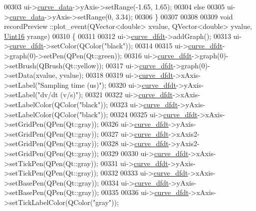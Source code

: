 \begin{DoxyCode}
00303   ui->\hyperlink{a00028_a247d94481323c0bc4f8b6458a8a535dd}{curve\_data}->yAxis->setRange(-1.65, 1.65);
00304   \textcolor{keywordflow}{else}
00305   ui->\hyperlink{a00028_a247d94481323c0bc4f8b6458a8a535dd}{curve\_data}->yAxis->setRange(0, 3.34);
00306 \}
00307 
00308 
00309 \textcolor{keywordtype}{void} recordPreview ::plot\_event(QVector<double> xvalue, QVector<double> yvalue, 
      \hyperlink{a00001_aae7407b021d43f7193a81a58cfb3e297}{Uint16} yrange)
00310 \{
00311 
00312   ui->\hyperlink{a00028_a43d24fa14d90cc27b310542e39dcdd1b}{curve\_dfdt}->addGraph();
00313   ui->\hyperlink{a00028_a43d24fa14d90cc27b310542e39dcdd1b}{curve\_dfdt}->setColor(QColor(\textcolor{stringliteral}{"black"}));
00314 
00315   ui->\hyperlink{a00028_a43d24fa14d90cc27b310542e39dcdd1b}{curve\_dfdt}->graph(0)->setPen(QPen(Qt::green));
00316   ui->\hyperlink{a00028_a43d24fa14d90cc27b310542e39dcdd1b}{curve\_dfdt}->graph(0)->setBrush(QBrush(Qt::yellow));
00317   ui->\hyperlink{a00028_a43d24fa14d90cc27b310542e39dcdd1b}{curve\_dfdt}->graph(0)->setData(xvalue, yvalue);
00318 
00319   ui->\hyperlink{a00028_a43d24fa14d90cc27b310542e39dcdd1b}{curve\_dfdt}->xAxis->setLabel(\textcolor{stringliteral}{"Sampling time (us)"});
00320   ui->\hyperlink{a00028_a43d24fa14d90cc27b310542e39dcdd1b}{curve\_dfdt}->yAxis->setLabel(\textcolor{stringliteral}{"dv/dt         (v/s)"});
00321 
00322   ui->\hyperlink{a00028_a43d24fa14d90cc27b310542e39dcdd1b}{curve\_dfdt}->xAxis->setLabelColor(QColor(\textcolor{stringliteral}{"black"}));
00323   ui->\hyperlink{a00028_a43d24fa14d90cc27b310542e39dcdd1b}{curve\_dfdt}->yAxis->setLabelColor(QColor(\textcolor{stringliteral}{"black"}));
00324 
00325   ui->\hyperlink{a00028_a43d24fa14d90cc27b310542e39dcdd1b}{curve\_dfdt}->xAxis->setGridPen(QPen(Qt::gray));
00326   ui->\hyperlink{a00028_a43d24fa14d90cc27b310542e39dcdd1b}{curve\_dfdt}->yAxis->setGridPen(QPen(Qt::gray));
00327   ui->\hyperlink{a00028_a43d24fa14d90cc27b310542e39dcdd1b}{curve\_dfdt}->xAxis2->setGridPen(QPen(Qt::gray));
00328   ui->\hyperlink{a00028_a43d24fa14d90cc27b310542e39dcdd1b}{curve\_dfdt}->yAxis2->setGridPen(QPen(Qt::gray));
00329 
00330   ui->\hyperlink{a00028_a43d24fa14d90cc27b310542e39dcdd1b}{curve\_dfdt}->xAxis->setTickPen(QPen(Qt::gray));
00331   ui->\hyperlink{a00028_a43d24fa14d90cc27b310542e39dcdd1b}{curve\_dfdt}->yAxis->setTickPen(QPen(Qt::gray));
00332 
00333   ui->\hyperlink{a00028_a43d24fa14d90cc27b310542e39dcdd1b}{curve\_dfdt}->xAxis->setBasePen(QPen(Qt::gray));
00334   ui->\hyperlink{a00028_a43d24fa14d90cc27b310542e39dcdd1b}{curve\_dfdt}->yAxis->setBasePen(QPen(Qt::gray));
00335 
00336   ui->\hyperlink{a00028_a43d24fa14d90cc27b310542e39dcdd1b}{curve\_dfdt}->xAxis->setTickLabelColor(QColor(\textcolor{stringliteral}{"gray"}));

\end{DoxyCode}
